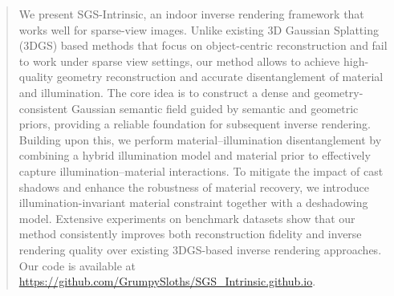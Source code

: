 \begin{abstract}

We present SGS-Intrinsic, an indoor inverse rendering framework that works well for sparse-view images. Unlike existing 3D Gaussian Splatting (3DGS) based methods that focus on object-centric reconstruction and fail to work under sparse view settings, our method allows to achieve high-quality geometry reconstruction and accurate disentanglement of material and illumination. The core idea is to construct a dense and geometry-consistent Gaussian semantic field guided by semantic and geometric priors, providing a reliable foundation for subsequent inverse rendering. Building upon this, we perform material–illumination disentanglement by combining a hybrid illumination model and material prior to effectively capture illumination–material interactions. To mitigate the impact of cast shadows and enhance the robustness of material recovery, we introduce illumination-invariant material constraint together with a deshadowing model. Extensive experiments on benchmark datasets show that our method consistently improves both reconstruction fidelity and inverse rendering quality over existing 3DGS-based inverse rendering approaches. Our code is available at \url{https://github.com/GrumpySloths/SGS_Intrinsic.github.io}.

\end{abstract}
